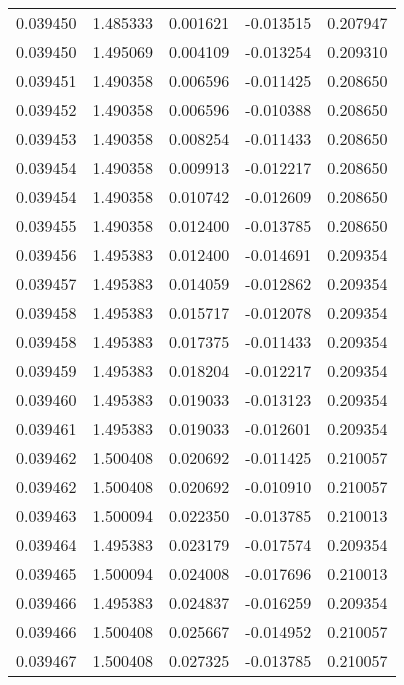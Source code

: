 \begin{tabular}{lrrrr}
0.039450    &  1.485333 &  0.001621 & -0.013515 &             0.207947 \\
0.039450    &  1.495069 &  0.004109 & -0.013254 &             0.209310 \\
0.039451    &  1.490358 &  0.006596 & -0.011425 &             0.208650 \\
0.039452    &  1.490358 &  0.006596 & -0.010388 &             0.208650 \\
0.039453    &  1.490358 &  0.008254 & -0.011433 &             0.208650 \\
0.039454    &  1.490358 &  0.009913 & -0.012217 &             0.208650 \\
0.039454    &  1.490358 &  0.010742 & -0.012609 &             0.208650 \\
0.039455    &  1.490358 &  0.012400 & -0.013785 &             0.208650 \\
0.039456    &  1.495383 &  0.012400 & -0.014691 &             0.209354 \\
0.039457    &  1.495383 &  0.014059 & -0.012862 &             0.209354 \\
0.039458    &  1.495383 &  0.015717 & -0.012078 &             0.209354 \\
0.039458    &  1.495383 &  0.017375 & -0.011433 &             0.209354 \\
0.039459    &  1.495383 &  0.018204 & -0.012217 &             0.209354 \\
0.039460    &  1.495383 &  0.019033 & -0.013123 &             0.209354 \\
0.039461    &  1.495383 &  0.019033 & -0.012601 &             0.209354 \\
0.039462    &  1.500408 &  0.020692 & -0.011425 &             0.210057 \\
0.039462    &  1.500408 &  0.020692 & -0.010910 &             0.210057 \\
0.039463    &  1.500094 &  0.022350 & -0.013785 &             0.210013 \\
0.039464    &  1.495383 &  0.023179 & -0.017574 &             0.209354 \\
0.039465    &  1.500094 &  0.024008 & -0.017696 &             0.210013 \\
0.039466    &  1.495383 &  0.024837 & -0.016259 &             0.209354 \\
0.039466    &  1.500408 &  0.025667 & -0.014952 &             0.210057 \\
0.039467    &  1.500408 &  0.027325 & -0.013785 &             0.210057 \\

\end{tabular}
